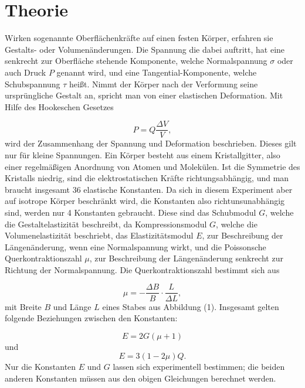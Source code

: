 \section{Theorie}
\label{sec:Theorie}



Wirken sogenannte Oberflächenkräfte auf einen festen Körper,
erfahren sie Gestalts- oder Volumenänderungen. Die Spannung
die dabei auftritt, hat eine senkrecht zur Oberfläche stehende Komponente, welche
Normalspannung $\sigma$ oder auch Druck $P$ genannt wird, und
eine Tangential-Komponente, welche Schubspannung $\tau$ heißt.
Nimmt der Körper nach der Verformung seine ursprüngliche Gestalt an, spricht
man von einer elastischen Deformation.  
Mit Hilfe des Hookeschen Gesetzes

\begin{equation}
  P = Q \frac{\Delta V}{V} ,
\end{equation}
wird der Zusammenhang  der Spannung und Deformation beschrieben.
Dieses gilt nur für kleine Spannungen. 
Ein Körper besteht aus einem Kristallgitter, also einer regelmäßigen Anordnung von Atomen und Molekülen.
Ist die Symmetrie des Kristalls niedrig, sind die elektrostatischen Kräfte richtungsabhängig, und man braucht insgesamt 36 elastische Konstanten.
Da sich in diesem Experiment aber auf isotrope Körper beschränkt wird, die Konstanten also richtunsunabhängig sind, werden nur 4 Konstanten gebraucht.
Diese sind das Schubmodul $G$, welche die Gestaltelastizität beschreibt,
da Kompressionsmodul $G$, welche die Volumenelastizität beschriebt, das Elastizitätsmodul $E$, zur 
Beschreibung der Längenänderung, wenn eine Normalspannung wirkt, und die Poissonsche Querkontraktionszahl $\mu$, zur Beschreibung der 
Längenänderung senkrecht zur Richtung der Normalspannung.
Die Querkontraktionszahl bestimmt sich aus

\begin{equation}
  \mu = - \frac{\Delta B}{B}\cdot \frac{L}{\Delta L} ,
\end{equation}
mit Breite $B$ und Länge $L$ eines Stabes aus Abbildung (1).
Insgesamt gelten folgende Beziehungen zwischen den Konstanten:

\begin{equation}
  E = 2G(\mu + 1) 
\end{equation}
und
\begin{equation}
  E = 3 (1-2\mu)Q .
\end{equation}
Nur die Konstanten $E$ und $G$ lassen sich experimentell bestimmen; die beiden anderen Konstanten 
müssen aus den obigen Gleichungen berechnet werden. 

